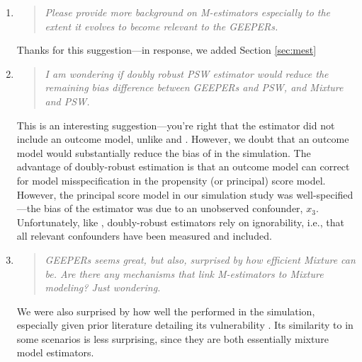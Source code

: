 \documentclass[]{article}
\newenvironment{itquote}
  {\begin{quote} \itshape}
  {\end{quote}\ignorespacesafterend}
\begin{document}
\begin{enumerate}

\item \begin{itquote}   Please provide more background on M-estimators especially to the extent it evolves to become relevant to the GEEPERs. 
\end{itquote}
Thanks for this suggestion---in response, we added Section \ref{sec:mest}
\item \begin{itquote}      I am wondering if doubly robust PSW estimator would reduce the remaining bias difference between GEEPERs and PSW, and Mixture and PSW.
\end{itquote}
This is an interesting suggestion---you're right that the \psw estimator did not include an outcome model, unlike \geepers and \nmm. However, we doubt that an outcome model would substantially reduce the bias of \psw in the simulation. The advantage of doubly-robust estimation is that an outcome model can correct for model misspecification in the propensity (or principal) score model. However, the principal score model in our simulation study was well-specified---the bias of the \psw estimator was due to an unobserved confounder, $x_3$. Unfortunately, like \psw, doubly-robust estimators rely on ignorability, i.e., that all relevant confounders have been measured and included. 
\item \begin{itquote}      GEEPERs seems great, but also, surprised by how efficient Mixture can be. Are there any mechanisms that link M-estimators to Mixture modeling? Just wondering.
\end{itquote}
We were also surprised by how well the \nmm performed in the simulation, especially given prior literature detailing its vulnerability \citep[][; cited in the paper]{griffin2008application,feller2016principal}. Its similarity to \geepers in some scenarios is less surprising, since they are both essentially mixture model estimators.


\end{enumerate}
\end{document}
